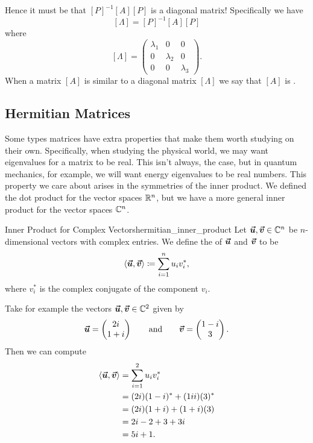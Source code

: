             Hence it must be that $[P]^{-1}[A][P]$ is a diagonal matrix! Specifically we have
            \[
            [\Lambda]=[P]^{-1}[A][P]
            \]
            where 
            \[
            [\Lambda] = \begin{pmatrix} \lambda_1 & 0 & 0 \\ 0 & \lambda_2 & 0 \\ 0 & 0 & \lambda_3 \end{pmatrix}.
            \]
            When a matrix $[A]$ is similar to a diagonal matrix $[\Lambda]$ we say that $[A]$ is .
            
            \subsection{Hermitian Matrices}
            Some types matrices have extra properties that make them worth studying on their own.  Specifically, when studying the physical world, we may want eigenvalues for a matrix to be real.  This isn't always, the case, but in quantum mechanics, for example, we will want energy eigenvalues to be real numbers. This property we care about arises in the symmetries of the inner product.  We defined the dot product for the vector spaces $\mathbb{R}^n$, but we have a more general inner product for the vector spaces $\mathbb{C}^n$.
    
            \begin{df}{Inner Product for Complex Vectors}{hermitian_inner_product}
                Let $\boldsymbol{\boldsymbol{\vec{u}}},\boldsymbol{\boldsymbol{\vec{v}}} \in \mathbb{C}^n$ be $n$-dimensional vectors with complex entries. We define the  of $\boldsymbol{\boldsymbol{\vec{u}}}$ and $\boldsymbol{\boldsymbol{\vec{v}}}$ to be
                \[
                \langle \boldsymbol{\boldsymbol{\vec{u}}},\boldsymbol{\boldsymbol{\vec{v}}} \rangle \coloneqq \sum_{i=1}^n u_i v_i^*,
                \]
                where $v_i^*$ is the complex conjugate of the component $v_i$.
            \end{df}

            Take for example the vectors $\boldsymbol{\boldsymbol{\vec{u}}},\boldsymbol{\boldsymbol{\vec{v}}} \in \mathbb{C}^2$ given by
            \[
            \boldsymbol{\boldsymbol{\vec{u}}} = \begin{pmatrix} 2i \\ 1+i \end{pmatrix} \qquad \textrm{and} \qquad \boldsymbol{\boldsymbol{\vec{v}}} = \begin{pmatrix} 1-i \\ 3 \end{pmatrix}.
            \]
            Then we can compute
            \begin{align*}
            \langle \boldsymbol{\boldsymbol{\vec{u}}}, \boldsymbol{\boldsymbol{\vec{v}}} \rangle &= \sum_{i=1}^2 u_i v_i^*\\
            &= (2i)(1-i)^* + (1ii)(3)^*\\
            &= (2i)(1+i)+(1+i)(3)\\
            &= 2i - 2 + 3 + 3i\\
            &=5i +1.
            \end{align*}

